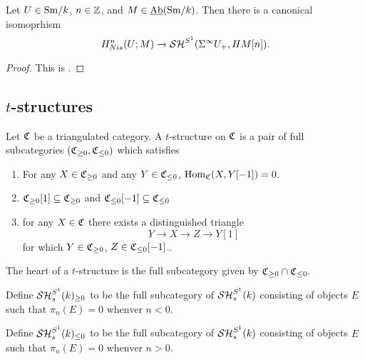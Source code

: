\documentclass{amsart}%
\begin{document}
\begin{proposition}
  Let $U \in \mathrm{Sm}/k$, $n\in \mathbb{Z}$, and $M \in \operatorname{\underline{Ab}}(\mathrm{Sm}/k)$. Then there
  is a canonical isomoprhism
  \begin{equation*}
    H^n_{Nis}(U; M) \to \mathcal{SH}^{S^1}(\Sigma^{\infty}U_+, HM[n]).
  \end{equation*}
\end{proposition}

\begin{proof}
  This is \cite[Lemma 3.2.3]{Mor05}.
\end{proof}

\subsection{$t$-structures}

\begin{definition}
  Let $\mathfrak{C}$ be a triangulated category. A $t$-structure on $\mathfrak{C}$
  is a pair of full subcategories $(\mathfrak{C}_{\geq 0}, \mathfrak{C}_{\leq 0})$
  which satisfies 
  \begin{enumerate}
      \item For any $X \in \mathfrak{C}_{\geq 0}$ and any
    $ Y \in \mathfrak{C}_{\leq 0}$, $\operatorname{Hom}_{\mathfrak{C}}(X, Y[-1])=0$.
      \item $\mathfrak{C}_{\geq 0}[1] \subseteq \mathfrak{C}_{\geq 0}$ and
    $\mathfrak{C}_{\leq 0}[-1] \subseteq \mathfrak{C}_{\leq 0}$

      \item for any $X \in \mathfrak{C}$ there exists a distinguished triangle 
    \begin{equation*}
      Y \to X \to Z \to Y[1]
    \end{equation*}
    for which $Y \in \mathfrak{C}_{\geq 0}$, $Z\in \mathfrak{C}_{\leq 0}[-1]$..
  \end{enumerate}

  The heart of a $t$-structure is the full subcategory given by
  $\mathfrak{C}_{\geq 0} \cap \mathfrak{C}_{\leq 0}$. 
\end{definition}

\begin{definition}[$t$-structure on $\SH_s^{S^1}(k)$]
  Define $\mathcal{SH}_s^{S^1}(k)_{\geq 0}$ to be the full subcategory of
  $\SH_s^{S^1}(k)$ consisting of objects $E$ such that $\pi_n(E)=0$
  whenver $n<0$.
  
  Define $\mathcal{SH}_s^{S^1}(k)_{\leq 0}$ to be the full subcategory of
  $\SH_s^{S^1}(k)$ consisting of objects $E$ such that $\pi_n(E)=0$
  whenver $n>0$.
\end{definition}
\end{document}
